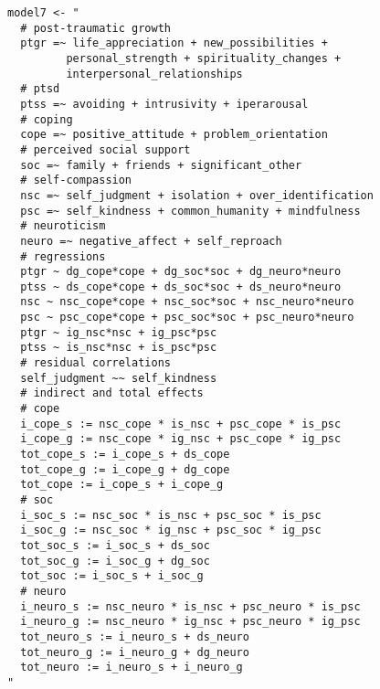 \documentclass[aps,floatfix,prl]{revtex4}
\begin{document}
\begin{verbatim}
model7 <- "
  # post-traumatic growth
  ptgr =~ life_appreciation + new_possibilities + 
         personal_strength + spirituality_changes + 
         interpersonal_relationships
  # ptsd
  ptss =~ avoiding + intrusivity + iperarousal
  # coping
  cope =~ positive_attitude + problem_orientation 
  # perceived social support
  soc =~ family + friends + significant_other
  # self-compassion
  nsc =~ self_judgment + isolation + over_identification
  psc =~ self_kindness + common_humanity + mindfulness
  # neuroticism
  neuro =~ negative_affect + self_reproach
  # regressions
  ptgr ~ dg_cope*cope + dg_soc*soc + dg_neuro*neuro
  ptss ~ ds_cope*cope + ds_soc*soc + ds_neuro*neuro
  nsc ~ nsc_cope*cope + nsc_soc*soc + nsc_neuro*neuro
  psc ~ psc_cope*cope + psc_soc*soc + psc_neuro*neuro
  ptgr ~ ig_nsc*nsc + ig_psc*psc 
  ptss ~ is_nsc*nsc + is_psc*psc
  # residual correlations
  self_judgment ~~ self_kindness
  # indirect and total effects
  # cope
  i_cope_s := nsc_cope * is_nsc + psc_cope * is_psc
  i_cope_g := nsc_cope * ig_nsc + psc_cope * ig_psc
  tot_cope_s := i_cope_s + ds_cope
  tot_cope_g := i_cope_g + dg_cope
  tot_cope := i_cope_s + i_cope_g
  # soc
  i_soc_s := nsc_soc * is_nsc + psc_soc * is_psc
  i_soc_g := nsc_soc * ig_nsc + psc_soc * ig_psc
  tot_soc_s := i_soc_s + ds_soc
  tot_soc_g := i_soc_g + dg_soc
  tot_soc := i_soc_s + i_soc_g
  # neuro
  i_neuro_s := nsc_neuro * is_nsc + psc_neuro * is_psc
  i_neuro_g := nsc_neuro * ig_nsc + psc_neuro * ig_psc
  tot_neuro_s := i_neuro_s + ds_neuro
  tot_neuro_g := i_neuro_g + dg_neuro
  tot_neuro := i_neuro_s + i_neuro_g
"
\end{verbatim}

\newpage
\end{document}
